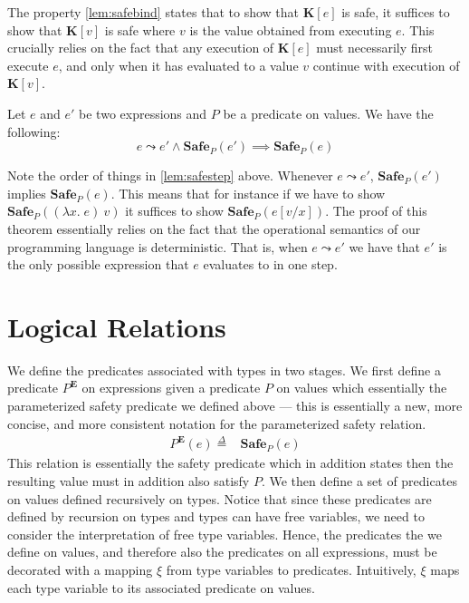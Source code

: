\documentclass{article}
\newcommand{\ectx}{\mathbf{K}}
\newcommand{\defeq}{\overset{\Delta}{=}}
\newcommand{\pred}{P}
\newcommand{\semErel}[1]{#1^{\textbf{E}}}
\newcommand{\semenv}{\xi}
\newcommand{\expr}{e}
\newcommand{\val}{v}
\newcommand{\var}{x}
\newcommand{\step}{\leadsto}
\newcommand{\Safe}[1]{\textbf{Safe}_{#1}}
\begin{document}
The property \ref{lem:safebind} states that to show that $\ectx[\expr]$ is safe, it suffices to show that $\ectx[\val]$ is safe where $\val$ is the value obtained from executing $\expr$.
This crucially relies on the fact that any execution of $\ectx[\expr]$ must necessarily first execute $\expr$, and only when it has evaluated to a value $\val$ continue with execution of $\ectx[\val]$.

\begin{safesteplemma}
  \makeatletter{}\makeatother
  \label{lem:safestep}
  Let $\expr$ and $\expr'$ be two expressions and $\pred$ be a predicate on values. We have the following:
  \[\expr \step \expr' \land \Safe{\pred}(\expr') \implies \Safe{\pred}(\expr) \]
\end{safesteplemma}

Note the order of things in \ref{lem:safestep} above.
Whenever $\expr \step \expr'$, $\Safe{\pred}(\expr')$ implies $\Safe{\pred}(\expr)$.
This means that for instance if we have to show $\Safe{\pred}((\lambda \var.\; \expr)~\val)$ it suffices to show $\Safe{\pred}(\expr[\val/\var])$.
The proof of this theorem essentially relies on the fact that the operational semantics of our programming language is deterministic.
That is, when $\expr \step \expr'$ we have that $\expr'$ is the only possible expression that $\expr$ evaluates to in one step.

\section{Logical Relations}
We define the predicates associated with types in two stages.
We first define a predicate $\semErel{\pred}$ on expressions given a predicate $\pred$ on values which essentially the parameterized safety predicate we defined above --- this is essentially a new, more concise, and more consistent notation for the parameterized safety relation.
\begin{align*}
  \semErel{\pred}(\expr) \defeq{}& \Safe{\pred}(\expr)
\end{align*}
This relation is essentially the safety predicate which in addition states then the resulting value must in addition also satisfy $\pred$.
We then define a set of predicates on values defined recursively on types.
Notice that since these predicates are defined by recursion on types and types can have free variables, we need to consider the interpretation of free type variables.
Hence, the predicates the we define on values, and therefore also the predicates on all expressions, must be decorated with a mapping $\semenv$ from type variables to predicates.
Intuitively, $\semenv$ maps each type variable to its associated predicate on values.
\end{document}
